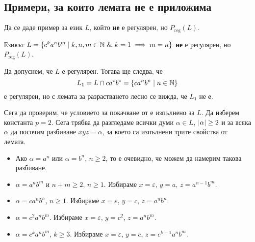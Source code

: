 \subsection*{Примери, за които лемата не е  приложима}

\begin{problem}
  Да се даде пример за език $L$, който {\bf не} е регулярен, но $P_{\text{reg}}(L)$.
\end{problem}

\begin{example}
  Езикът $L = \{c^ka^nb^m\mid k,n,m \in \Nat\ \&\ k = 1\implies m = n\}$
  {\bf не} е регулярен, но $P_{\text{reg}}(L)$.
\end{example}
\begin{hint}
  Да допуснем, че $L$ е регулярен.
  Тогава ще следва, че 
  \[L_1 = L\cap ca^\star b^\star = \{ca^nb^n \mid n\in\mathbb{N}\}\]
  е регулярен,
  но с лемата за разрастването лесно се вижда, че $L_1$ не е.

  Сега да проверим, че условието за покачване от  е изпълнено за $L$.
  Да изберем константа $p = 2$.
  Сега трябва да разгледаме всички думи $\alpha \in L$, $\vert{\alpha}\vert \geq 2$
  и за всяка $\alpha$ да посочим разбиване $xyz = \alpha$, за което са изпълнени трите свойства от лемата.

  \begin{itemize}
  \item
    Ако $\alpha = a^n$ или $\alpha = b^n$, $n\geq 2$, то е  очевидно, че можем да
    намерим такова разбиване.
  \item
    $\alpha = a^nb^m$ и $n+m \geq 2$, $n \geq 1$.
    Избираме $x = \varepsilon$, $y = a$, $z = a^{n-1}b^m$.
  \item
    $\alpha = ca^nb^n$, $n\geq 1$.
    Избираме $x = \varepsilon$, $y = c$, $z = a^nb^n$.
  \item
    $\alpha = c^2a^nb^m$. 
    Избираме $x = \varepsilon$, $y = c^2$, $z = a^nb^m$.
  \item
    $\alpha = c^ka^nb^m$, $k \geq 3$.
    Избираме $x = \varepsilon$, $y = c$, $z = c^{k-1}a^nb^m$.
  \end{itemize}
\end{hint}
